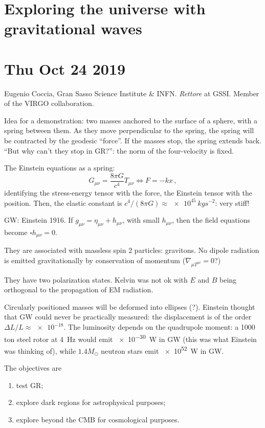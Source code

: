 \documentclass[main.tex]{subfiles}
\begin{document}
\section{Exploring the universe with gravitational waves}

\section*{Thu Oct 24 2019}

Eugenio Coccia, Gran Sasso Science Institute \& INFN.
\emph{Rettore} at GSSI.
Member of the VIRGO collaboration.

Idea for a demonstration: two masses anchored to the surface of a sphere, with a spring between them. As they move perpendicular to the spring, the spring will be contracted by the geodesic ``force''.
If the masses stop, the spring extends back.
``But why can't they stop in GR?'': the norm of the four-velocity is fixed. 

The Einstein equations as a spring:
%
\begin{equation}
  G_{\mu \nu } = \frac{8 \pi G }{c^{4}} T_{\mu \nu } \iff
  F = -kx
\,,
\end{equation}
%
identifying the stress-energy tensor with the force, the Einstein tensor with the position. Then, the elastic constant is \(c^{4}/ (8 \pi G) \approx \SI{e45}{kg s^{-2}}\): very stiff! 

GW: Einstein 1916. If \(g_{\mu  \nu }= \eta_{ \mu \nu } + h_{\mu \nu }\), with small \(h_{\mu \nu }\), then the field equations become \(\square h_{\mu \nu }=0\).

They are associated with massless spin 2 particles: gravitons. No dipole radiation is emitted gravitationally by conservation of momentum (\(\nabla_{\mu T^{\mu i}}=0\)?)

They have two polarization states.
Kelvin was not ok with \(E\) and \(B\) being orthogonal to the propagation of EM radiation.

Circularly positioned masses will be deformed into ellipses (?).
Einstein thought that GW could never be practically measured: the displacement is of the order \(\Delta L / L \approx \num{e-18}\).
The luminosity depends on the quadrupole moment: a 1000 ton steel rotor at \SI{4}{Hz} would emit \SI{e-30}{W} in GW (this was what Einstein was thinking of), while \(1.4 M_{\odot}\) neutron stars emit \SI{e52}{W} in GW.

The objectives are 

\begin{enumerate}
    \item test GR;
    \item explore dark regions for astrophysical purposes;
    \item explore beyond the CMB for cosmological purposes.
\end{enumerate}
\end{document}
